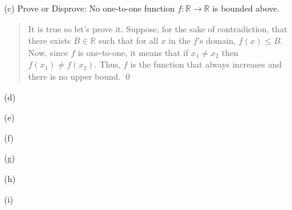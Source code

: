 \documentclass[12pt, a4paper]{article}
\newcommand{\reals}{\mathbb{R}}
\newcommand{\rarr}{\rightarrow}
\begin{document}
\begin{itemize}
\begin{itemize}
\item[]

\item[(c)]
Prove or Disprove: No one-to-one function $f : \reals \rarr \reals$ is bounded above.
\begin{quote}
It is true so let's prove it. Suppose, for the sake of contradiction, that there exists $B \in \reals$
such that for all $x$ in the $f$'s domain, $f(x) \leq B$. Now, since $f$ is one-to-one,
it means that if $x_1 \neq x_2$ then $f(x_1) \neq f(x_2)$. Thus, $f$ is the function that
always increases and there is no upper bound.
\qed
\end{quote}

\item[]

\item[(d)]

\item[]

\item[(e)]

\item[]

\item[(f)]

\item[]

\item[(g)]

\item[]

\item[(h)]

\item[]

\item[(i)]

\end{itemize}
\end{itemize}
\end{document}
